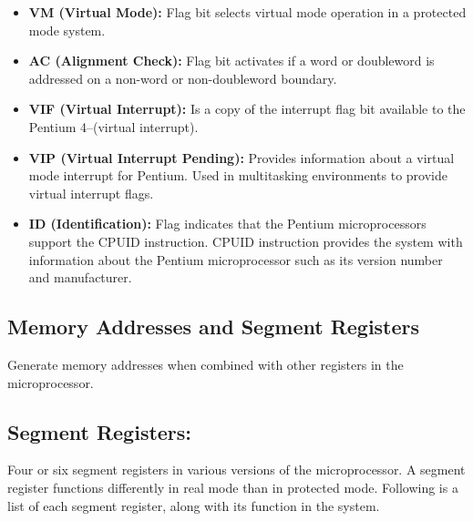 \documentclass{article}
\begin{document}
\begin{itemize}
    \item \textbf{VM (Virtual Mode):} Flag bit selects virtual mode operation in a protected mode system.
    
    \item \textbf{AC (Alignment Check):} Flag bit activates if a word or doubleword is addressed on a non-word or non-doubleword boundary.
    
    \item \textbf{VIF (Virtual Interrupt):} Is a copy of the interrupt flag bit available to the Pentium 4–(virtual interrupt).
    
    \item \textbf{VIP (Virtual Interrupt Pending):} Provides information about a virtual mode interrupt for Pentium. Used in multitasking environments to provide virtual interrupt flags.
    
    \item \textbf{ID (Identification):} Flag indicates that the Pentium microprocessors support the CPUID instruction. CPUID instruction provides the system with information about the Pentium microprocessor such as its version number and manufacturer.
\end{itemize}

\subsection*{Memory Addresses and Segment Registers}

Generate memory addresses when combined with other registers in the microprocessor.

\subsection*{Segment Registers:}
Four or six segment registers in various versions of the microprocessor. A segment register functions differently in real mode than in protected mode. Following is a list of each segment register, along with its function in the system.
\end{document}
